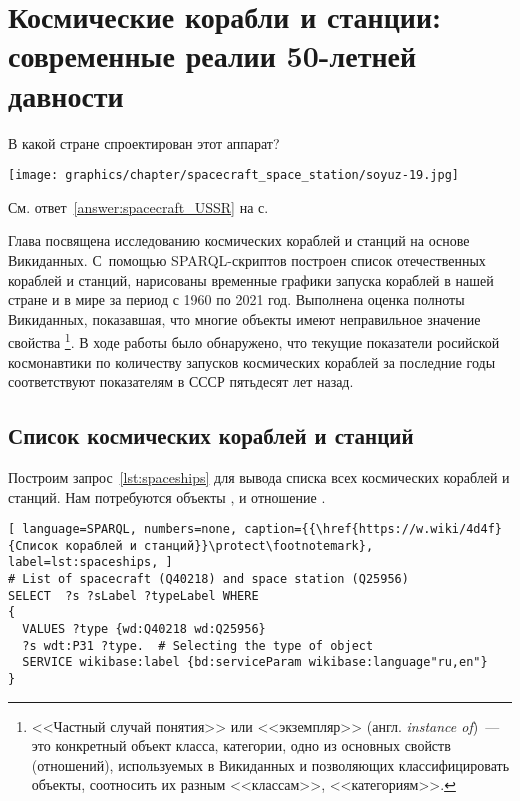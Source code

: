 \chapter{Космические корабли и станции: современные реалии 50-летней давности}
\label{ch:spacecraft-space-station}

\begin{marginfigure}[16\baselineskip]
    \MarginQuestion
    В какой стране спроектирован этот аппарат?

    \vspace{3pt}
	\texttt{[image: graphics/chapter/spacecraft\_space\_station/soyuz-19.jpg]}

    См. ответ~\ref{answer:spacecraft_USSR} на с.~\pageref{answer:spacecraft_USSR}\\
    \label{question:spacecraft_soyuz19}
\end{marginfigure}

Глава посвящена исследованию космических кораблей и станций на основе Викиданных. 
С~помощью SPARQL-скриптов построен список отечественных кораблей и станций, 
нарисованы временные графики запуска кораблей в нашей стране и в мире за период с 1960 по 2021 год. 
Выполнена оценка полноты Викиданных, показавшая, 
что многие объекты имеют неправильное значение свойства \footnote{%
    <<Частный случай понятия>> или <<экземпляр>> 
    (англ. \emph{instance of})~--- это конкретный объект класса, категории, 
    одно из основных свойств (отношений), используемых в Викиданных и позволяющих классифицировать объекты, 
    соотносить их разным <<классам>>, <<категориям>>.%
}. 
В ходе работы было обнаружено, что текущие показатели росийской космонавтики по количеству запусков космических кораблей за последние годы соответствуют показателям в СССР пятьдесят лет назад. 



\section{Список космических кораблей и станций}

Построим запрос~\ref{lst:spaceships} для вывода списка всех космических кораблей и станций. 
Нам потребуются объекты , 
 и отношение . 

\begin{lstlisting}[ language=SPARQL, numbers=none, caption={{\href{https://w.wiki/4d4f}{Список кораблей и станций}}\protect\footnotemark}, label=lst:spaceships, ]
# List of spacecraft (Q40218) and space station (Q25956)
SELECT  ?s ?sLabel ?typeLabel WHERE
{
  VALUES ?type {wd:Q40218 wd:Q25956}
  ?s wdt:P31 ?type.  # Selecting the type of object
  SERVICE wikibase:label {bd:serviceParam wikibase:language"ru,en"}
}
\end{lstlisting}


